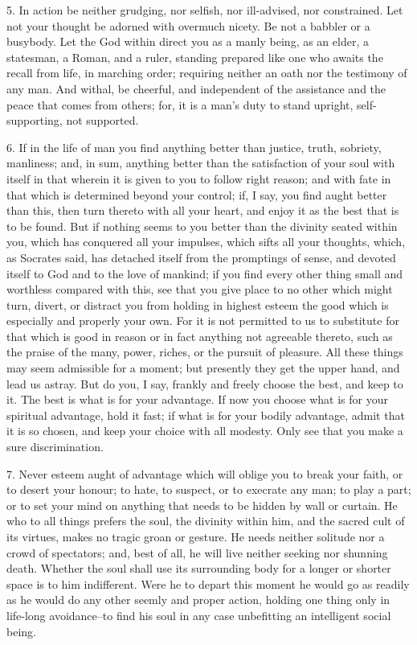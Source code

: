 \documentclass{book}
\begin{document}
5. In action be neither grudging, nor selfish, nor ill-advised, nor
constrained. Let not your thought be adorned with overmuch nicety. Be
not a babbler or a busybody. Let the God within direct you as a manly
being, as an elder, a statesman, a Roman, and a ruler, standing
prepared like one who awaits the recall from life, in marching order;
requiring neither an oath nor the testimony of any man. And withal, be
cheerful, and independent of the assistance and the peace that comes
from others; for, it is a man's duty to stand upright, self-supporting,
not supported.

6. If in the life of man you find anything better than justice, truth,
sobriety, manliness; and, in sum, anything better than the
satisfaction of your soul with itself in that wherein it is given to
you to follow right reason; and with fate in that which is determined
beyond your control; if, I say, you find aught better than this, then
turn thereto with all your heart, and enjoy it as the best that is to
be found. But if nothing seems to you better than the divinity seated
within you, which has conquered all your impulses, which sifts all
your thoughts, which, as Socrates said, has detached itself from the
promptings of sense, and devoted itself to God and to the love of
mankind; if you find every other thing small and worthless compared
with this, see that you give place to no other which might turn,
divert, or distract you from holding in highest esteem the good which
is especially and properly your own. For it is not permitted to us to
substitute for that which is good in reason or in fact anything not
agreeable thereto, such as the praise of the many, power, riches, or
the pursuit of pleasure. All these things may seem admissible for a
moment; but presently they get the upper hand, and lead us astray. But
do you, I say, frankly and freely choose the best, and keep to it. The
best is what is for your advantage. If now you choose what is for your
spiritual advantage, hold it fast; if what is for your bodily
advantage, admit that it is so chosen, and keep your choice with all
modesty. Only see that you make a sure discrimination.

7. Never esteem aught of advantage which will oblige you to break your
faith, or to desert your honour; to hate, to suspect, or to execrate
any man; to play a part; or to set your mind on anything that needs to
be hidden by wall or curtain. He who to all things prefers the soul,
the divinity within him, and the sacred cult of its virtues, makes no
tragic groan or gesture. He needs neither solitude nor a crowd of
spectators; and, best of all, he will live neither seeking nor
shunning death. Whether the soul shall use its surrounding body for a
longer or shorter space is to him indifferent. Were he to depart this
moment he would go as readily as he would do any other seemly and
proper action, holding one thing only in life-long avoidance--to find
his soul in any case unbefitting an intelligent social being.
\end{document}
